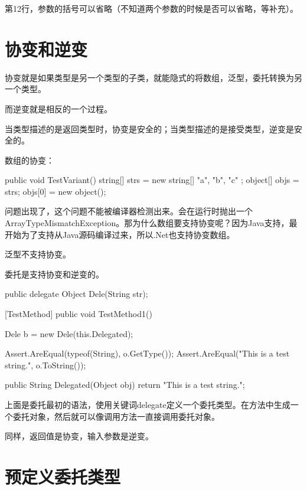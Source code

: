 第12行，参数的括号可以省略（不知道两个参数的时候是否可以省略，等补充）。

\section{协变和逆变}

协变就是如果类型是另一个类型的子类，就能隐式的将数组，泛型，委托转换为另一个类型。

而逆变就是相反的一个过程。

当类型描述的是返回类型时，协变是安全的；当类型描述的是接受类型，逆变是安全的。

数组的协变：

\begin{CSharp}
        public void TestVariant()
        {
            string[] strs = new string[] { "a", "b", "c" };
            object[] objs = strs;
            objs[0] = new object();
        }
\end{CSharp}

问题出现了，这个问题不能被编译器检测出来。会在运行时抛出一个ArrayTypeMismatchException。那为什么数组要支持协变呢？因为Java支持，最开始为了支持从Java源码编译过来，所以.Net也支持协变数组。

泛型不支持协变。

委托是支持协变和逆变的。

\begin{CSharp}[协变和逆变]
        
        public delegate Object Dele(String str);

        [TestMethod]
        public void TestMethod1()
        {
            Dele b = new Dele(this.Delegated);

            Assert.AreEqual(typeof(String), o.GetType());
            Assert.AreEqual("This is a test string.", o.ToString());            
        }

        public String Delegated(Object obj) { return "This is a test string.";}
\end{CSharp}

上面是委托最初的语法，使用关键词delegate定义一个委托类型。在方法中生成一个委托对象，然后就可以像调用方法一直接调用委托对象。

同样，返回值是协变，输入参数是逆变。


\section{预定义委托类型}


